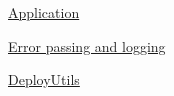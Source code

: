 \hyperlink{libs_Application}{Application}

\hyperlink{libs_Error}{Error passing and logging}

\hyperlink{libs_DeployUtils}{Deploy\+Utils} 